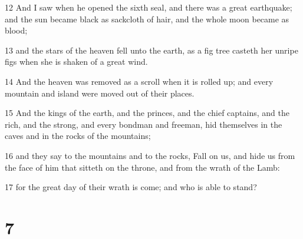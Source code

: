 \par 12 And I saw when he opened the sixth seal, and there was a great earthquake; and the sun became black as sackcloth of hair, and the whole moon became as blood;
\par 13 and the stars of the heaven fell unto the earth, as a fig tree casteth her unripe figs when she is shaken of a great wind.
\par 14 And the heaven was removed as a scroll when it is rolled up; and every mountain and island were moved out of their places.
\par 15 And the kings of the earth, and the princes, and the chief captains, and the rich, and the strong, and every bondman and freeman, hid themselves in the caves and in the rocks of the mountains;
\par 16 and they say to the mountains and to the rocks, Fall on us, and hide us from the face of him that sitteth on the throne, and from the wrath of the Lamb:
\par 17 for the great day of their wrath is come; and who is able to stand?

\chapter{7}


